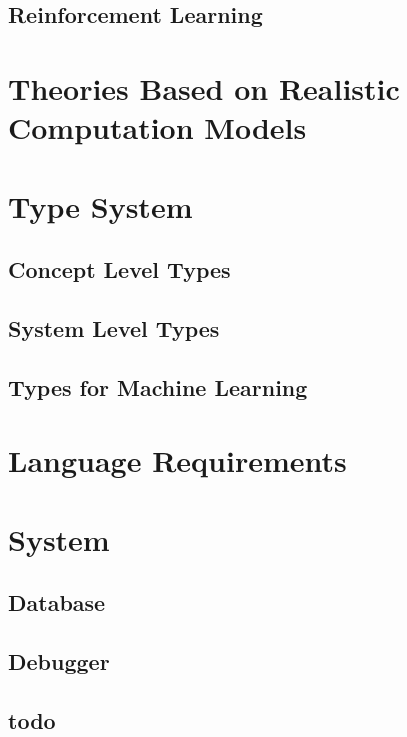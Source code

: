 \documentclass[11pt, oneside]{article}   	%
\theoremstyle{definition}
\begin{document}
\subsection{Reinforcement Learning}

\section{Theories Based on Realistic Computation Models}



\section{Type System}

\subsection{Concept Level Types}


\subsection{System Level Types}

\subsection{Types for Machine Learning}

\section{Language Requirements}

\section{System}

\subsection{Database}

\subsection{Debugger}

\subsection{todo}
\end{document}
